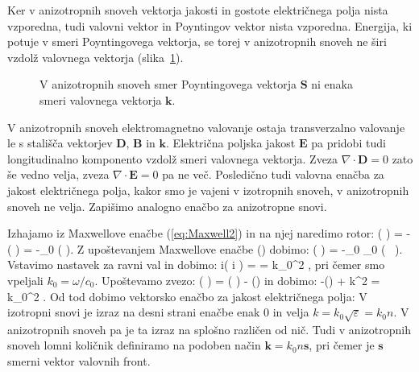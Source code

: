 Ker v anizotropnih snoveh vektorja jakosti in gostote električnega 
polja nista vzporedna, tudi valovni vektor in Poyntingov vektor nista 
vzporedna. Energija, ki potuje v smeri Poyntingovega vektorja, se
torej v anizotropnih snoveh ne širi vzdolž valovnega vektorja (slika~\ref{fig:10_koti}). 
\begin{figure}[!h]
\centering
\def\svgwidth{40truemm} 

\caption{V anizotropnih snoveh smer Poyntingovega 
vektorja $\mathbf{S}$ ni enaka smeri valovnega vektorja $\mathbf{k}$.}
\label{fig:10_koti}
\end{figure}

V anizotropnih snoveh elektromagnetno valovanje ostaja transverzalno
valovanje le s stališča vektorjev $\mathbf{D}$, $\mathbf{B}$ in 
$\mathbf{k}$. Električna poljska jakost $\mathbf{E}$ pa pridobi 
tudi longitudinalno komponento vzdolž smeri valovnega vektorja. 
Zveza $\nabla \cdot \mathbf{D} = 0$ zato še vedno velja, zveza 
$\nabla \cdot \mathbf{E} = 0$ pa ne več. Posledično tudi valovna
enačba za jakost električnega polja, kakor smo je vajeni
v izotropnih snoveh, v anizotropnih snoveh ne velja. Zapišimo 
analogno enačbo za anizotropne snovi. 

Izhajamo iz Maxwellove enačbe (\ref{eq:Maxwell2}) in na njej naredimo rotor:
\beq
\nabla \times \left( \nabla \times {} \right) = -  
\left( \nabla \times {} \right) = -\mu_0  
\left( \nabla \times {} \right).
\label{eq:10_020}
\eeq
Z upoštevanjem Maxwellove enačbe () dobimo:
\beq
\nabla \times \left( \nabla \times {} \right) = -\mu_0 \varepsilon_0 
 \left( \underline{\varepsilon}\, \right).
\label{eq:10_021}
\eeq
Vstavimo nastavek za ravni val in dobimo:
\beq
i\times \left( i  \times {}\right) = 
\underline{\varepsilon}  = 
k_0^2 \underline{\varepsilon} ,
\label{eq:10_022}
\eeq
pri čemer smo vpeljali $k_0 = \omega / c_0$. Upoštevamo zvezo:
\beq
{}\times\left( \times {}\right) = \left(\cdot 
{}\right)  - \left(\cdot {}\right) 
\label{eq:10_023}
\eeq
in dobimo:
\beq
-\left(\cdot {}\right) + k^2  = 
k_0^2 \underline{\varepsilon} .
\label{eq:10_024}
\eeq
Od tod dobimo vektorsko enačbo za jakost električnega polja:
V izotropni snovi je izraz na desni strani enačbe enak 0 in velja $k = k_0\sqrt{\varepsilon} = k_0 n$. V anizotropnih
snoveh pa je ta izraz na splošno različen od nič. Tudi v anizotropnih snoveh lomni količnik
definiramo na podoben način $\mathbf{k}= k_0 n \mathbf{s}$, pri čemer je $\mathbf{s}$ smerni vektor
valovnih front.

